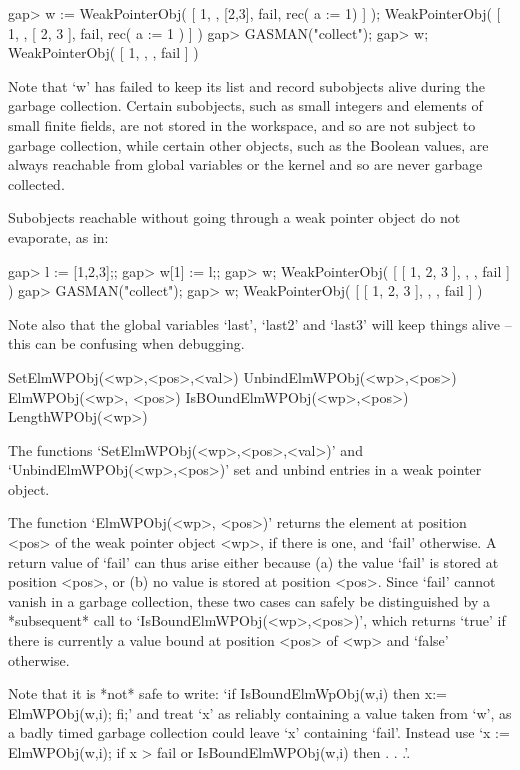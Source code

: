 \beginexample
gap> w := WeakPointerObj( [ 1, , [2,3], fail, rec( a := 1) ] );
WeakPointerObj( [ 1, , [ 2, 3 ], fail, rec( a := 1 ) ] )
gap> GASMAN("collect");
gap> w;
WeakPointerObj( [ 1, , , fail ] )
\endexample

Note that `w' has failed to keep its  list and record subobjects alive during
the garbage    collection.  Certain subobjects, such  as   small integers and
elements of small finite fields, are not stored in  the workspace, and so are
not subject  to garbage collection, while certain  other objects, such as the
Boolean values, are always reachable from  global variables or the kernel and
so are never garbage collected.

Subobjects reachable without  going  through  a weak  pointer object  do  not
evaporate, as in:

\beginexample
gap> l := [1,2,3];;
gap> w[1] := l;;
gap> w;
WeakPointerObj( [ [ 1, 2, 3 ], , , fail ] )
gap> GASMAN("collect");
gap> w;                
WeakPointerObj( [ [ 1, 2, 3 ], , , fail ] )
\endexample

Note also  that the global  variables  `last', `last2' and `last3'  will keep
things alive -- this can be confusing when debugging.


\>SetElmWPObj(<wp>,<pos>,<val>)
\>UnbindElmWPObj(<wp>,<pos>)
\>ElmWPObj(<wp>, <pos>)
\>IsBOundElmWPObj(<wp>,<pos>)
\>LengthWPObj(<wp>)

The          functions           `SetElmWPObj(<wp>,<pos>,<val>)'          and
`UnbindElmWPObj(<wp>,<pos>)' set and unbind entries in a weak pointer object.

The function `ElmWPObj(<wp>, <pos>)' returns the element at position <pos> of
the weak pointer object <wp>, if there is one, and `fail' otherwise. A return
value of `fail' can thus arise either because (a)  the value `fail' is stored
at position <pos>, or (b) no value is stored  at position <pos>. Since `fail'
cannot   vanish in  a  garbage collection,   these   two cases can  safely be
distinguished by  a *subsequent* call to `IsBoundElmWPObj(<wp>,<pos>)', which
returns `true' if there is currently a value bound at  position <pos> of <wp>
and `false' otherwise.

Note that it  is  *not*  safe to write:   `if IsBoundElmWpObj(w,i)  then  x:=
ElmWPObj(w,i); fi;'  and treat `x' as  reliably containing a value taken from
`w', as a badly  timed garbage collection could  leave `x' containing `fail'. 
Instead use `x := ElmWPObj(w,i); if x \<> fail or IsBoundElmWPObj(w,i) then . 
. .'.

